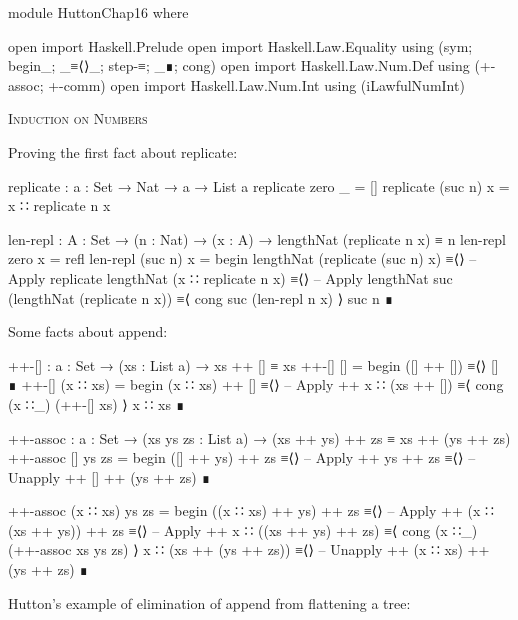 \documentclass{article}
\begin{document}
\begin{code}
module HuttonChap16 where

open import Haskell.Prelude
open import Haskell.Law.Equality using (sym; begin_; _≡⟨⟩_; step-≡; _∎; cong)
open import Haskell.Law.Num.Def using (+-assoc; +-comm)
open import Haskell.Law.Num.Int using (iLawfulNumInt)
\end{code}

\noindent
\textsc{Induction on Numbers}

\noindent
Proving the first fact about replicate:

\begin{code}
replicate : {a : Set} → Nat → a → List a
replicate zero _ = []
replicate (suc n) x = x ∷ replicate n x
\end{code}
\begin{code}
len-repl : {A : Set} → (n : Nat) → (x : A) → lengthNat (replicate n x) ≡ n
len-repl zero x = refl
len-repl (suc n) x =
  begin
    lengthNat (replicate (suc n) x)
  ≡⟨⟩ -- Apply replicate
    lengthNat (x ∷ replicate n x)
  ≡⟨⟩ -- Apply lengthNat
    suc (lengthNat (replicate n x))
  ≡⟨ cong suc (len-repl n x) ⟩
    suc n
  ∎
\end{code}

\noindent
Some facts about append:

\begin{code}
++-[] : {a : Set} → (xs : List a) → xs ++ [] ≡ xs
++-[] [] = begin ([] ++ []) ≡⟨⟩ [] ∎
++-[] (x ∷ xs) =
    begin
      (x ∷ xs) ++ []
    ≡⟨⟩ -- Apply ++
      x ∷ (xs ++ [])
    ≡⟨ cong (x ∷_) (++-[] xs) ⟩
      x ∷ xs
    ∎
\end{code}
\begin{code}
++-assoc : {a : Set} → (xs ys zs : List a)
    → (xs ++ ys) ++ zs ≡ xs ++ (ys ++ zs)
++-assoc [] ys zs =
    begin
      ([] ++ ys) ++ zs
    ≡⟨⟩ -- Apply ++
      ys ++ zs
    ≡⟨⟩ -- Unapply ++
      [] ++ (ys ++ zs)
    ∎
\end{code}
\begin{code}
++-assoc (x ∷ xs) ys zs =
    begin
      ((x ∷ xs) ++ ys) ++ zs
    ≡⟨⟩ -- Apply ++
      (x ∷ (xs ++ ys)) ++ zs
    ≡⟨⟩ -- Apply ++
      x ∷ ((xs ++ ys) ++ zs)
    ≡⟨ cong (x ∷_) (++-assoc xs ys zs) ⟩
      x ∷ (xs ++ (ys ++ zs))
    ≡⟨⟩ -- Unapply ++
      (x ∷ xs) ++ (ys ++ zs)
    ∎
\end{code}

\noindent Hutton's example of elimination of append from flattening a tree:
\end{document}
